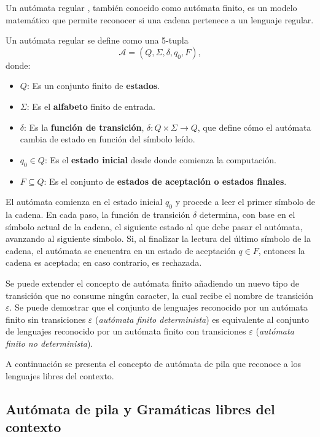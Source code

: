 Un autómata regular \cite{authomataTheory}, también conocido como autómata finito, es un modelo matemático que 
permite reconocer si una cadena pertenece a un lenguaje regular. 

Un autómata regular se define como una 5-tupla $$\mathcal{A} = (Q, \Sigma, \delta, q_0, F),$$ donde:

\begin{itemize}
      \item $Q$: Es un conjunto finito de \textbf{estados}.
      \item $\Sigma$: Es el \textbf{alfabeto} finito de entrada.
      \item $\delta$: Es la \textbf{función de transición}, $\delta: Q \times \Sigma \to Q$, que define cómo el autómata cambia de estado en función del símbolo leído.
      \item $q_0 \in Q$: Es el \textbf{estado inicial} desde donde comienza la computación.
      \item $F \subseteq Q$: Es el conjunto de \textbf{estados de aceptación o estados finales}.
\end{itemize}

El autómata comienza en el estado inicial $q_0$ y procede a leer el primer símbolo de la cadena.
En cada paso, la función de transición $\delta$ determina, con base en el símbolo actual de la cadena, el siguiente estado al que debe pasar el autómata, avanzando al siguiente símbolo.
Si, al finalizar la lectura del último símbolo de la cadena, el autómata se encuentra en un estado de aceptación $q \in F$, entonces la cadena es aceptada; en caso contrario, es rechazada.

Se puede extender el concepto de autómata finito añadiendo un nuevo tipo de transición que no consume ningún caracter, la cual recibe el nombre de transición $\varepsilon$. Se puede demostrar \cite{authomataTheory} que el conjunto de lenguajes reconocido por un autómata finito sin transiciones $\varepsilon$ (\textit{autómata finito determinista}) es equivalente al conjunto de lenguajes reconocido por un autómata finito con transiciones $\varepsilon$ (\textit{autómata finito no determinista}).

A continuación se presenta el concepto de autómata de pila que reconoce a los lenguajes libres del contexto.
\subsection{Autómata de pila y Gramáticas libres del contexto}


